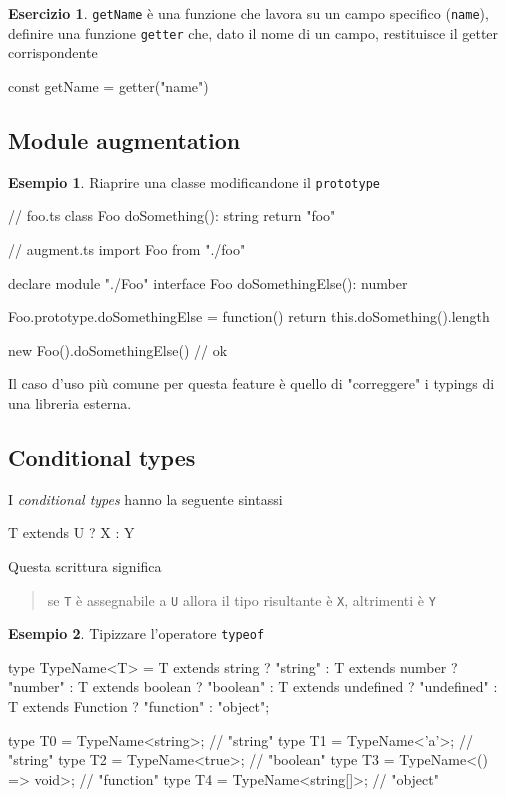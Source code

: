 \documentclass[12pt]{article}
\theoremstyle{definition}
\newtheorem{example}{Esempio}[subsection]
\newtheorem{exercise}{Esercizio}[subsection]
\newenvironment{code}
  {\vspace{0.5cm} \VerbatimEnvironment\begin{typescriptcode}}
  {\end{typescriptcode} \vspace{0.2cm}}
\begin{document}
\begin{exercise}
\texttt{getName} è una funzione che lavora su un campo specifico (\texttt{name}), definire
una funzione \texttt{getter} che, dato il nome di un campo, restituisce il getter corrispondente

\begin{code}
const getName = getter("name")
\end{code}
\end{exercise}

\subsection{Module augmentation}

\begin{example}
Riaprire una classe modificandone il \texttt{prototype}

\begin{code}
// foo.ts
class Foo {
  doSomething(): string {
    return "foo"
  }
}

// augment.ts
import { Foo } from "./foo"

declare module "./Foo" {
  interface Foo {
    doSomethingElse(): number
  }
}

Foo.prototype.doSomethingElse = function() {
  return this.doSomething().length
}

new Foo().doSomethingElse() // ok
\end{code}
\end{example}

Il caso d'uso più comune per questa feature è quello di "correggere" i typings di una libreria esterna.

\subsection{Conditional types}

I \emph{conditional types} hanno la seguente sintassi

\begin{code}
T extends U ? X : Y
\end{code}

Questa scrittura significa

\begin{quote}
se \texttt{T} è assegnabile a \texttt{U} allora il tipo risultante è \texttt{X}, altrimenti è \texttt{Y}
\end{quote}

\begin{example}
Tipizzare l'operatore \texttt{typeof}

\begin{code}
type TypeName<T> =
    T extends string ? "string" :
    T extends number ? "number" :
    T extends boolean ? "boolean" :
    T extends undefined ? "undefined" :
    T extends Function ? "function" :
    "object";

type T0 = TypeName<string>;  // "string"
type T1 = TypeName<'a'>;  // "string"
type T2 = TypeName<true>;  // "boolean"
type T3 = TypeName<() => void>;  // "function"
type T4 = TypeName<string[]>;  // "object"
\end{code}
\end{example}
\end{document}
